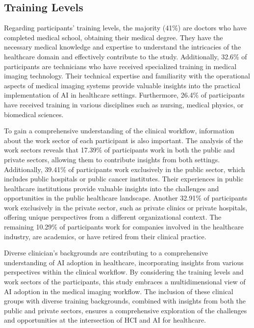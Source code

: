 \subsection{Training Levels}
\label{chap:app002003002}

Regarding participants' training levels, the majority (41\%) are doctors who have completed medical school, obtaining their medical degree.
They have the necessary medical knowledge and expertise to understand the intricacies of the healthcare domain and effectively contribute to the study.
Additionally, 32.6\% of participants are technicians who have received specialized training in medical imaging technology.
Their technical expertise and familiarity with the operational aspects of medical imaging systems provide valuable insights into the practical implementation of \ac{AI} in healthcare settings.
Furthermore, 26.4\% of participants have received training in various disciplines such as nursing, medical physics, or biomedical sciences.

To gain a comprehensive understanding of the clinical workflow, information about the work sector of each participant is also important.
The analysis of the work sectors reveals that 17.39\% of participants work in both the public and private sectors, allowing them to contribute insights from both settings.
Additionally, 39.41\% of participants work exclusively in the public sector, which includes public hospitals or public cancer institutes.
Their experiences in public healthcare institutions provide valuable insights into the challenges and opportunities in the public healthcare landscape.
Another 32.91\% of participants work exclusively in the private sector, such as private clinics or private hospitals, offering unique perspectives from a different organizational context.
The remaining 10.29\% of participants work for companies involved in the healthcare industry, are academics, or have retired from their clinical practice.

Diverse clinician's backgrounds are contributing to a comprehensive understanding of \ac{AI} adoption in healthcare, incorporating insights from various perspectives within the clinical workflow.
By considering the training levels and work sectors of the participants, this study embraces a multidimensional view of \ac{AI} adoption in the medical imaging workflow.
The inclusion of these clinical groups with diverse training backgrounds, combined with insights from both the public and private sectors, ensures a comprehensive exploration of the challenges and opportunities at the intersection of \ac{HCI} and \ac{AI} for healthcare.

